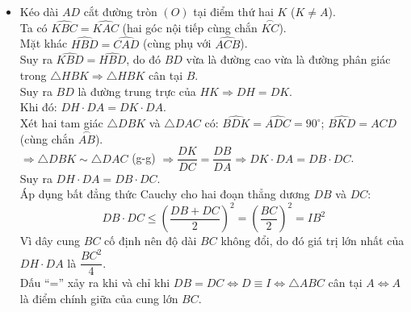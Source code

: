 \begin{ex}
{\begin{itemize}
    \item[c)] Kéo dài $AD$ cắt đường tròn $(O)$ tại điểm thứ hai $K$ ($K \neq A$).\\
    Ta có $\widehat{KBC} = \widehat{KAC}$ (hai góc nội tiếp cùng chắn $\stackrel{\frown}{KC}$).\\
    Mặt khác $\widehat{HBD} = \widehat{CAD}$ (cùng phụ với $\widehat{ACB}$).\\
    Suy ra $\widehat{KBD} = \widehat{HBD}$, do đó $BD$ vừa là đường cao vừa là đường phân giác trong $\triangle HBK \Rightarrow \triangle HBK$ cân tại $B$.\\
    Suy ra $BD$ là đường trung trực của $HK \Rightarrow DH = DK$.\\
    Khi đó: $DH \cdot DA = DK \cdot DA$.\\
    Xét hai tam giác $\triangle DBK$ và $\triangle DAC$ có:
    $\widehat{BDK} = \widehat{ADC} = 90^\circ$; $\widehat{BKD} = \widehat{ACD}$ (cùng chắn $\stackrel{\frown}{AB}$).\\
    $\Rightarrow \triangle DBK \sim \triangle DAC$ (g-g) $\Rightarrow \dfrac{DK}{DC} = \dfrac{DB}{DA} \Rightarrow DK \cdot DA = DB \cdot DC$.\\
    Suy ra $DH \cdot DA = DB \cdot DC$.\\
    Áp dụng bất đẳng thức Cauchy cho hai đoạn thẳng dương $DB$ và $DC$:
    $$DB \cdot DC \le \left(\dfrac{DB + DC}{2}\right)^2 = \left(\dfrac{BC}{2}\right)^2 = IB^2$$
    Vì dây cung $BC$ cố định nên độ dài $BC$ không đổi, do đó giá trị lớn nhất của $DH \cdot DA$ là $\dfrac{BC^2}{4}$.\\
    Dấu “=” xảy ra khi và chỉ khi $DB = DC \iff D \equiv I \iff \triangle ABC$ cân tại $A \iff A$ là điểm chính giữa của cung lớn $BC$.
\end{itemize}
}
\end{ex}
